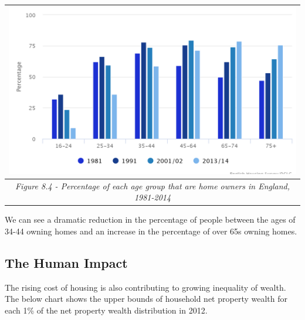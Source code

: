 \documentclass[]{tufte-handout}
\begin{document}
\begin{longtable}[]{@{}c@{}}
\toprule
\begin{minipage}[b]{0.97\columnwidth}\centering
\includegraphics{ChapterPictures/8-4-Percentageownershipbyage.png}\strut
\end{minipage}\tabularnewline
\midrule
\endhead
\begin{minipage}[t]{0.97\columnwidth}\centering
\emph{Figure 8.4 - Percentage of each age group that are home owners in
England, 1981-2014}\strut
\end{minipage}\tabularnewline
\bottomrule
\end{longtable}

We can see a dramatic reduction in the percentage of people between the
ages of 34-44 owning homes and an increase in the percentage of over 65s
owning homes.

\hypertarget{the-human-impact}{%
\subsection{The Human Impact}\label{the-human-impact}}

The rising cost of housing is also contributing to growing inequality of
wealth. The below chart shows the upper bounds of household net property
wealth for each 1\% of the net property wealth distribution in 2012.
\end{document}
